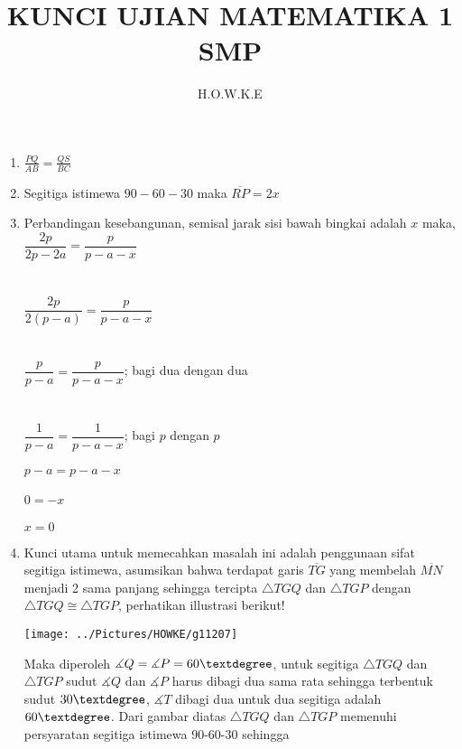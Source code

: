 \documentclass[12pt,a4paper]{article}
\author{H.O.W.K.E}
\title{KUNCI UJIAN MATEMATIKA 1 SMP}
\begin{document}
	\maketitle
	\begin{enumerate}
		\item $\frac{PQ}{AB}=\frac{QS}{BC}$ 
		\item Segitiga istimewa $90-60-30$ maka $\overline{RP}=2x$ 
		\item Perbandingan kesebangunan, semisal jarak sisi bawah bingkai adalah $x$ maka,
		\\ $\dfrac{2p}{2p-2a}= \dfrac{p}{p-a-x} $ \\
		\\
		\\ $\dfrac{2p}{2(p-a)}=\dfrac{p}{p-a-x}$ \\
		\\
		\\ $\dfrac{p}{p-a}=\dfrac{p}{p-a-x}$; bagi dua dengan dua \\
		\\
		\\ $\dfrac{1}{p-a}=\dfrac{1}{p-a-x}$; bagi $p$ dengan $p$ \\
		\\ $p-a=p-a-x$ \\
		\\ $0=-x$ \\
		\\ $x=0$ 
		\item Kunci utama untuk memecahkan masalah ini adalah penggunaan sifat segitiga istimewa, asumsikan bahwa terdapat garis $\overline{TG}$ yang membelah $\overline{MN}$ menjadi 2 sama panjang sehingga tercipta $\triangle TGQ$ dan $\triangle TGP$ dengan
		$\triangle TGQ \cong \triangle TGP$, perhatikan illustrasi berikut!
		\begin{center}
		\texttt{[image: ../Pictures/HOWKE/g11207]}
		\end{center}
		Maka diperoleh $\measuredangle Q=\measuredangle P = 60 \textdegree$, untuk segitiga $\triangle TGQ$ dan  $\triangle TGP$ sudut $\measuredangle Q$ dan $\measuredangle P$ harus dibagi dua sama rata 
		sehingga terbentuk sudut $30 \textdegree$, $\measuredangle T$ dibagi dua untuk dua segitiga adalah $60\textdegree$. Dari gambar diatas $\triangle TGQ$ dan $\triangle TGP$ memenuhi persyaratan segitiga istimewa 90-60-30 sehingga \\
		

\end{enumerate}
\end{document}
